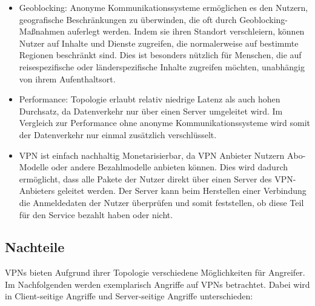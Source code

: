 \begin{itemize}
    \item Geoblocking: Anonyme Kommunikationssysteme ermöglichen es den Nutzern, geografische Beschränkungen zu überwinden, die oft durch Geoblocking-Maßnahmen auferlegt werden. Indem sie ihren Standort verschleiern, können Nutzer auf Inhalte und Dienste zugreifen, die normalerweise auf bestimmte Regionen beschränkt sind. Dies ist besonders nützlich für Menschen, die auf reisespezifische oder länderspezifische Inhalte zugreifen möchten, unabhängig von ihrem Aufenthaltsort.
    \item Performance: Topologie erlaubt relativ niedrige Latenz als auch hohen Durchsatz, da Datenverkehr nur über einen Server umgeleitet wird. Im Vergleich zur Performance ohne anonyme Kommunikationssysteme wird somit der Datenverkehr nur einmal zusätzlich verschlüsselt.
    \item VPN ist einfach nachhaltig Monetarisierbar, da VPN Anbieter Nutzern Abo-Modelle oder andere Bezahlmodelle anbieten können. Dies wird dadurch ermöglicht, dass alle Pakete der Nutzer direkt über einen Server des VPN-Anbieters geleitet werden. Der Server kann beim Herstellen einer Verbindung die Anmeldedaten der Nutzer überprüfen und somit feststellen, ob diese Teil für den Service bezahlt haben oder nicht.
\end{itemize}

\subsection{Nachteile}

VPNs bieten Aufgrund ihrer Topologie verschiedene Möglichkeiten für Angreifer. Im Nachfolgenden werden exemplarisch Angriffe auf VPNs betrachtet. Dabei wird in Client-seitige Angriffe und Server-seitige Angriffe unterschieden:

